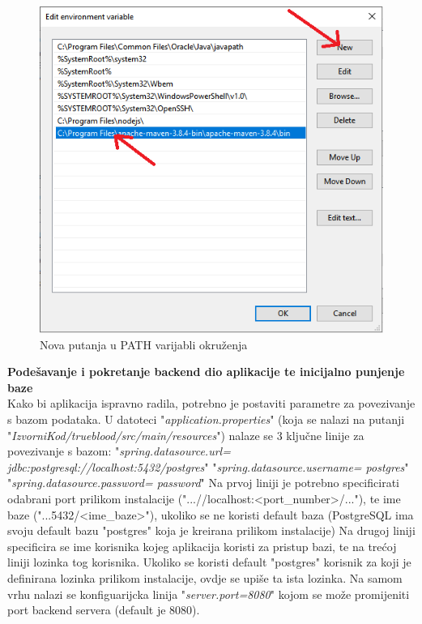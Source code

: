 			\begin{figure}[H]
			\centering
			\includegraphics[width=\textwidth, scale=0.5]{slike/newPathInsert}
			\caption{Nova putanja u PATH varijabli okruženja}
			\label{fig:newPathInsert}
			\end{figure}
			
			\textbf{Podešavanje i pokretanje backend dio aplikacije te inicijalno punjenje baze}\\
			Kako bi aplikacija ispravno radila, potrebno je postaviti parametre za povezivanje s bazom podataka. U datoteci "\textit{application.properties}" (koja se nalazi na putanji "\textit{IzvorniKod/trueblood/src/main/resources}") nalaze se 3 ključne linije za povezivanje s bazom:
			"\textit{spring.datasource.url= jdbc:postgresql://localhost:5432/postgres}"
			"\textit{spring.datasource.username= postgres}"
			"\textit{spring.datasource.password= password}"
			Na prvoj liniji je potrebno specificirati odabrani port prilikom instalacije ("...//localhost:<port_number>/..."), te ime baze ("...5432/<ime_baze>"), ukoliko se ne koristi default baza (PostgreSQL ima svoju default bazu "postgres" koja je kreirana prilikom instalacije)
			Na drugoj liniji specificira se ime korisnika kojeg aplikacija koristi za pristup bazi, te na trećoj liniji lozinka tog korisnika. Ukoliko se koristi default "postgres" korisnik za koji je definirana lozinka prilikom instalacije, ovdje se upiše ta ista lozinka.
			Na samom vrhu nalazi se konfiguarijcka linija "\textit{server.port=8080}" kojom se može promijeniti port backend servera (default je 8080).
			
